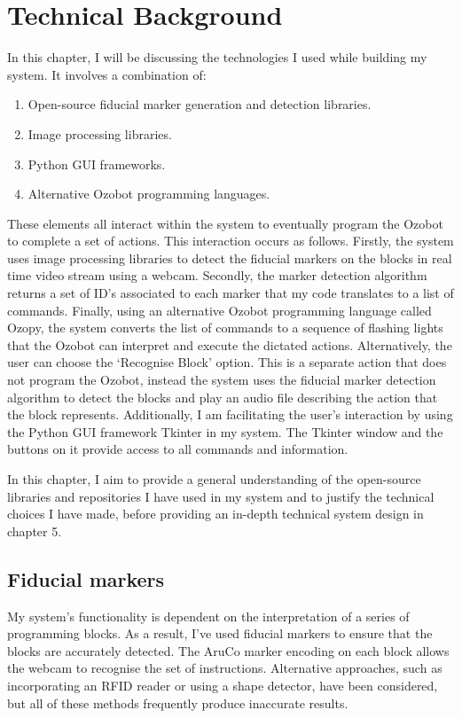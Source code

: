 \documentclass[oneside,%
                    author={Malak Hajji},
                    degree={BSc},
                    title={Designing An Accessible Computational Toolkit For Students},
                  subtitle={With Mixed Visual Abilities}]{dissertation}
\begin{document}

\chapter{Technical Background}
\label{chap:evaluation}



\noindent
In this chapter, I will be discussing the technologies I used while building my system. It involves a combination of:

\begin{enumerate}
\item Open-source fiducial marker generation and detection libraries.
\item Image processing libraries.
\item Python GUI frameworks. 
\item Alternative Ozobot programming languages.
\end{enumerate}

\noindent
These elements all interact within the system to eventually program the Ozobot to complete a set of actions. This interaction occurs as follows.
Firstly, the system uses image processing libraries to detect the fiducial markers on the blocks in real time video stream using a webcam. Secondly, the marker detection algorithm returns a set of ID’s associated to each marker that my code translates to a list of commands. Finally, using an alternative Ozobot programming language called Ozopy, the system converts the list of commands to a sequence of flashing lights that the Ozobot can interpret and execute the dictated actions. 
Alternatively, the user can choose the ‘Recognise Block’ option. This is a separate action that does not program the Ozobot, instead the system uses the fiducial marker detection algorithm to detect the blocks and play an audio file describing the action that the block represents. 
Additionally, I am facilitating the user’s interaction by using the Python GUI framework Tkinter in my system. The Tkinter window and the buttons on it provide access to all commands and information. 

In this chapter, I aim to provide a general understanding of the open-source libraries and repositories I have used in my system and to justify the technical choices I have made, before providing an in-depth technical system design in chapter 5.

\section{Fiducial markers}
\noindent
My system's functionality is dependent on the interpretation of a series of programming blocks. As a result, I've used fiducial markers to ensure that the blocks are accurately detected. The AruCo marker encoding on each block allows the webcam to recognise the set of instructions. 
Alternative approaches, such as incorporating an RFID reader or using a shape detector, have been considered, but all of these methods frequently produce inaccurate results.
\end{document}
